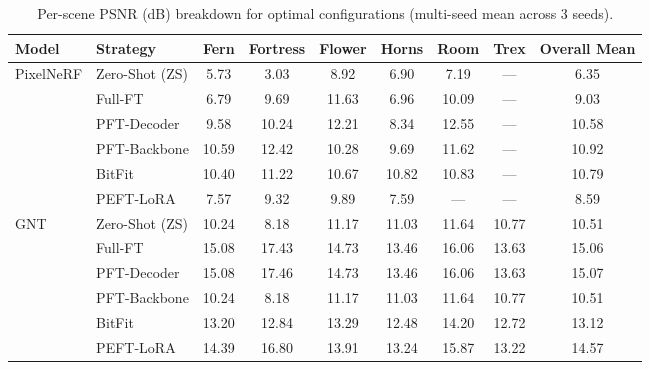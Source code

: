 \begin{table}[t]
\centering
\caption{Per-scene PSNR (dB) breakdown for optimal configurations (multi-seed mean across 3 seeds).}
\label{tab:per_scene_breakdown}
\small
\begin{tabular*}{\linewidth}{@{\extracolsep{\fill}}llcccccc|c@{\extracolsep{0pt}}}
\toprule
Model & Strategy & Fern & Fortress & Flower & Horns & Room & Trex & Overall Mean \\
\midrule
\multirow{6}{*}{PixelNeRF}
 & Zero-Shot (ZS)   &   5.73 &   3.03 &   8.92 &   6.90 &   7.19 &    --- &   6.35 \\
 & Full-FT          &   6.79 &   9.69 &  11.63 &   6.96 &  10.09 &    --- &   9.03 \\
 & PFT-Decoder      &   9.58 &  10.24 &  12.21 &   8.34 &  12.55 &    --- &  10.58 \\
 & PFT-Backbone     &  10.59 &  12.42 &  10.28 &   9.69 &  11.62 &    --- &  10.92 \\
 & BitFit           &  10.40 &  11.22 &  10.67 &  10.82 &  10.83 &    --- &  10.79 \\
 & PEFT-LoRA        &   7.57 &   9.32 &   9.89 &   7.59 &    --- &    --- &   8.59 \\
\midrule
\multirow{6}{*}{GNT}
 & Zero-Shot (ZS)   &  10.24 &   8.18 &  11.17 &  11.03 &  11.64 &  10.77 &  10.51 \\
 & Full-FT          &  15.08 &  17.43 &  14.73 &  13.46 &  16.06 &  13.63 &  15.06 \\
 & PFT-Decoder      &  15.08 &  17.46 &  14.73 &  13.46 &  16.06 &  13.63 &  15.07 \\
 & PFT-Backbone     &  10.24 &   8.18 &  11.17 &  11.03 &  11.64 &  10.77 &  10.51 \\
 & BitFit           &  13.20 &  12.84 &  13.29 &  12.48 &  14.20 &  12.72 &  13.12 \\
 & PEFT-LoRA        &  14.39 &  16.80 &  13.91 &  13.24 &  15.87 &  13.22 &  14.57 \\
\bottomrule
\end{tabular*}
\end{table}
